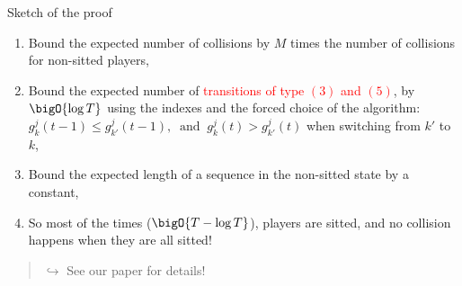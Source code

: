 \documentclass[12pt,english,ignorenonframetext,aspectratio=169,]{beamer}
\begin{document}
\begin{frame}{Sketch of the proof}

\begin{enumerate}
\def\labelenumi{\arabic{enumi}.}
\item
  Bound the expected number of collisions by \(M\) times the number of
  collisions for non-sitted players,\pause
\item
  Bound the expected number of
  \textcolor<2>{red}{transitions of type $(3)$ and $(5)$}, by
  \(\bigO{\log T}\) using the \klUCB{} indexes and the forced choice of
  the algorithm:
  \(g_k^j(t-1) \leq g^j_{k'}(t-1), \;\;\text{and}\;\; g_k^j(t) > g^j_{k'}(t)\)
  when switching from \(k'\) to \(k\),\pause
\item
  Bound the expected length of a sequence in the non-sitted state by a
  constant,\pause
\item
  So most of the times (\(\bigO{T - \log T}\)), players are sitted, and
  no collision happens when they are all sitted!
\end{enumerate}

\begin{quote}
\strut

\hfill\(\hookrightarrow\) See our paper for details!
\end{quote}

\end{frame}
\end{document}

